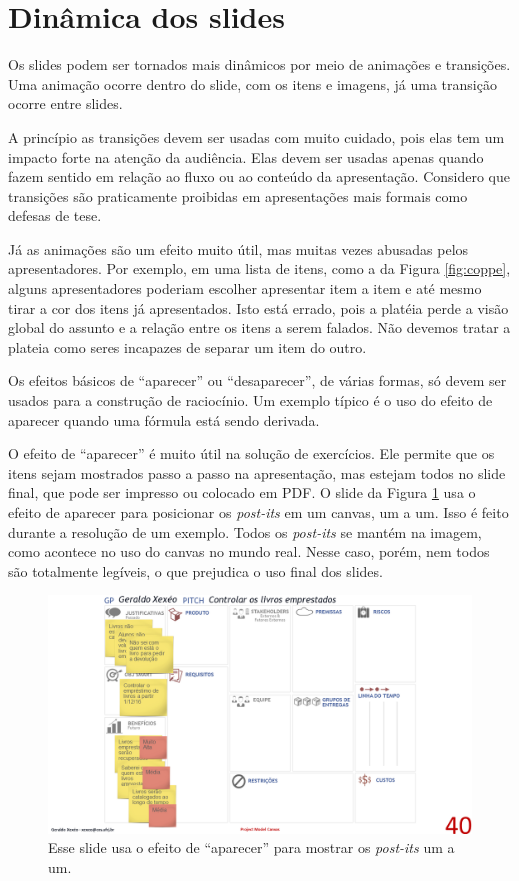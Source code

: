 \section{Dinâmica dos slides}
\label{sec:din}

Os slides podem ser tornados mais dinâmicos por meio de animações e transições. Uma animação ocorre dentro do slide, com os itens e imagens, já uma transição ocorre entre slides.

A princípio as transições devem ser usadas com muito cuidado, pois elas tem um impacto forte na atenção da audiência. Elas devem ser usadas apenas quando fazem sentido em relação ao fluxo ou ao conteúdo da apresentação. Considero que transições são praticamente proibidas em apresentações mais formais como defesas de tese.

Já as animações são um efeito muito útil, mas muitas vezes abusadas pelos apresentadores. Por exemplo, em uma lista de itens, como a da Figura \ref{fig:coppe}, alguns apresentadores poderiam escolher apresentar item a item e até mesmo tirar a cor dos itens já apresentados. Isto está errado, pois a platéia perde a visão global do assunto e a relação entre os itens a serem falados. Não devemos tratar a plateia como seres incapazes de separar um item do outro.

Os efeitos  básicos de ``aparecer'' ou ``desaparecer'', de várias formas, só devem ser usados para a construção de raciocínio. Um exemplo típico é o uso do efeito de aparecer quando uma fórmula está sendo derivada.

O efeito de ``aparecer'' é muito útil na solução de exercícios. Ele permite que os itens sejam mostrados passo a passo na apresentação, mas estejam todos no slide final, que pode ser impresso ou colocado em PDF. O slide da Figura \ref{fig:canvas} usa o efeito de aparecer para posicionar os \textit{post-its} em um canvas, um a um. Isso é feito durante a resolução de um exemplo. Todos os \textit{post-its} se mantém na imagem, como acontece no uso do canvas no mundo real. Nesse caso, porém, nem todos são totalmente legíveis, o que prejudica o uso final dos slides.


\begin{figure}[htb]
    \centering
    \includegraphics[width=\tam\linewidth,frame]{imagens/canvas}
    \caption{Esse slide usa o efeito de ``aparecer'' para mostrar os \textit{post-its} um a um.}
    \label{fig:canvas}
\end{figure}


